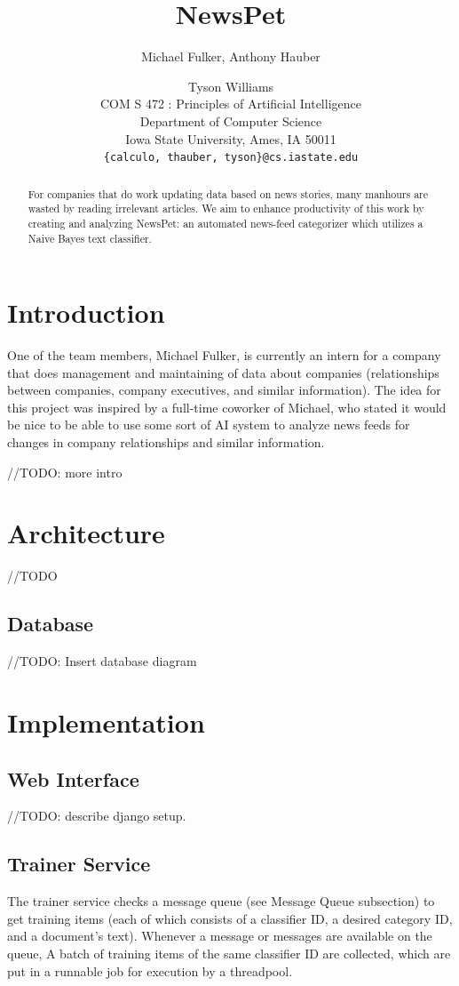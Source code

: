 \documentclass[letterpaper]{article}
\title{NewsPet}
\author{Michael Fulker, Anthony Hauber \and Tyson Williams \\
COM S 472 : Principles of Artificial Intelligence\\Department of Computer Science\\ Iowa State University, Ames, IA 50011\\
\texttt{\{calculo, thauber, tyson\}@cs.iastate.edu}}
\begin{document}
\nocopyright%
\maketitle

\begin{abstract}
For companies that do work updating data based on news stories, many manhours are wasted by reading irrelevant articles. We aim to enhance productivity of this work by creating and analyzing NewsPet: an automated news-feed categorizer which utilizes a Naive Bayes text classifier.
\end{abstract}


\section{Introduction}
One of the team members, Michael Fulker, is currently an intern for a company that does management and maintaining of data about companies (relationships between companies, company executives, and similar information). The idea for this project was inspired by a full-time coworker of Michael, who stated it would be nice to be able to use some sort of AI system to analyze news feeds for changes in company relationships and similar information.

//TODO: more intro

\section{Architecture}
//TODO
\subsection{Database}
//TODO: Insert database diagram

\section{Implementation}
\subsection{Web Interface}
//TODO: describe django setup.

\subsection{Trainer Service}
The trainer service checks a message queue (see Message Queue subsection) to get training items (each of which consists of a classifier ID, a desired category ID, and a document's text).
Whenever a message or messages are available on the queue, A batch of training items of the same classifier ID are collected, which are put in a runnable job for execution by a threadpool.
\end{document}
